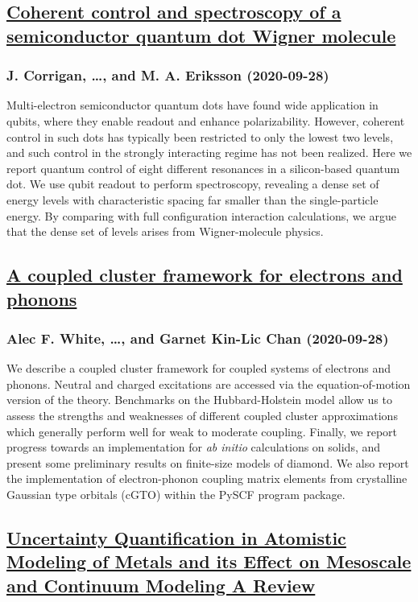 \subsection*{\href{http://arxiv.org/abs/2009.13572v1}{Coherent control and spectroscopy of a semiconductor quantum dot Wigner  molecule}}
\subsubsection*{J. Corrigan, \dots, and M. A. Eriksson (2020-09-28)}
Multi-electron semiconductor quantum dots have found wide application in
qubits, where they enable readout and enhance polarizability. However, coherent
control in such dots has typically been restricted to only the lowest two
levels, and such control in the strongly interacting regime has not been
realized. Here we report quantum control of eight different resonances in a
silicon-based quantum dot. We use qubit readout to perform spectroscopy,
revealing a dense set of energy levels with characteristic spacing far smaller
than the single-particle energy. By comparing with full configuration
interaction calculations, we argue that the dense set of levels arises from
Wigner-molecule physics.

\subsection*{\href{http://arxiv.org/abs/2009.13568v1}{A coupled cluster framework for electrons and phonons}}
\subsubsection*{Alec F. White, \dots, and Garnet Kin-Lic Chan (2020-09-28)}
We describe a coupled cluster framework for coupled systems of electrons and
phonons. Neutral and charged excitations are accessed via the
equation-of-motion version of the theory. Benchmarks on the Hubbard-Holstein
model allow us to assess the strengths and weaknesses of different coupled
cluster approximations which generally perform well for weak to moderate
coupling. Finally, we report progress towards an implementation for {\it ab
initio} calculations on solids, and present some preliminary results on
finite-size models of diamond. We also report the implementation of
electron-phonon coupling matrix elements from crystalline Gaussian type
orbitals (cGTO) within the PySCF program package.

\subsection*{\href{http://arxiv.org/abs/2009.13557v1}{Uncertainty Quantification in Atomistic Modeling of Metals and its  Effect on Mesoscale and Continuum Modeling A Review}}
